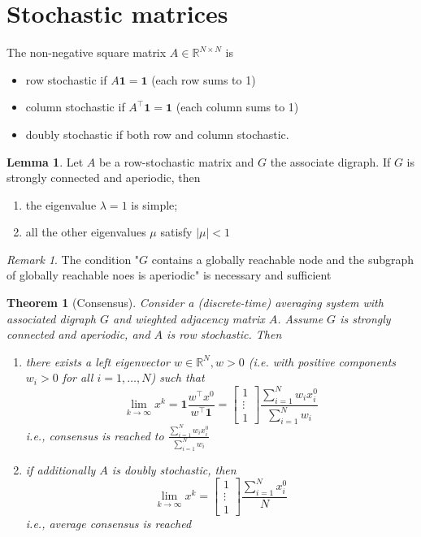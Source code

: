 \documentclass{book}
\newcommand{\R}{\mathbb{R}}
\theoremstyle{theoremv2}
\newtheorem{theorem}{Theorem}[chapter]
\theoremstyle{defv2}
\theoremstyle{remark}
\newtheorem*{remark}{Remark}
\theoremstyle{remark}
\theoremstyle{definition}
\newtheorem*{lemma}{Lemma}
\theoremstyle{definition}
\begin{document}
\section{Stochastic matrices}
The non-negative square matrix $A\in\R^{N\times N}$ is 
\begin{itemize}
    \item row stochastic if $A\mathbf{1}=\mathbf{1}$ (each row sums to 1)
    \item column stochastic if $A^\top \mathbf{1}=\mathbf{1}$ (each column sums to 1)
    \item doubly stochastic if both row and column stochastic.
\end{itemize}
\begin{lemma}
    Let $A$ be a row-stochastic matrix and $G$ the associate digraph. If $G$ is strongly connected and aperiodic, then 
    \begin{enumerate}
        \item the eigenvalue $\lambda=1$ is simple; 
        \item all the other eigenvalues $\mu$ satisfy $|\mu|<1$
    \end{enumerate}
\end{lemma}
\begin{remark}
    The condition "$G$ contains a globally reachable node and the subgraph of globally reachable noes is aperiodic" is necessary and sufficient
\end{remark}
\begin{theorem}[Consensus]
    Consider a (discrete-time) averaging system with associated digraph $G$ and wieghted adjacency matrix $A$. Assume $G$ is strongly connected and aperiodic, and $A$ is row stochastic. Then 
    \begin{enumerate}
        \item there exists a left eigenvector $w\in\R^N,w>0$ (i.e. with positive components $w_i>0$ for all $i=1,\dots,N$) such that 
            \[
                \lim_{k\to\infty}x^k = \mathbf{1}\displaystyle\frac{w^\top x^0}{w^\top \mathbf{1}} = \begin{bmatrix}
                    1 \\ \vdots \\ 1
                \end{bmatrix} \displaystyle\frac{\sum_{i=1}^{N}w_ix_i^0}{\sum_{i=1}^{N}w_i}
            \]
            i.e., consensus is reached to $ \displaystyle\frac{\sum_{i=1}^{N}w_ix_i^0}{\sum_{i=1}^{N}w_i}$
        \item if additionally $A$ is doubly stochastic, then 
            \[
                \lim_{k\to\infty}x^k = \begin{bmatrix}
                    1 \\ \vdots \\ 1
                \end{bmatrix} \displaystyle\frac{\sum_{i=1}^{N}x_i^0}{N}
            \]
            i.e., average consensus is reached
    \end{enumerate}
\end{theorem}
\end{document}
